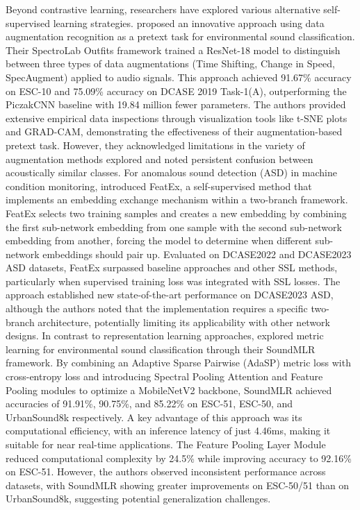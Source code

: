 \documentclass[11pt]{article}
\begin{document}
Beyond contrastive learning, researchers have explored various alternative self-supervised learning strategies. \citep{TRIPATHI2021108183} proposed an innovative approach using data augmentation recognition as a pretext task for environmental sound classification. Their SpectroLab Outfits framework trained a ResNet-18 model to distinguish between three types of data augmentations (Time Shifting, Change in Speed, SpecAugment) applied to audio signals. This approach achieved 91.67\% accuracy on ESC-10 and 75.09\% accuracy on DCASE 2019 Task-1(A), outperforming the PiczakCNN baseline with 19.84 million fewer parameters. The authors provided extensive empirical data inspections through visualization tools like t-SNE plots and GRAD-CAM, demonstrating the effectiveness of their augmentation-based pretext task. However, they acknowledged limitations in the variety of augmentation methods explored and noted persistent confusion between acoustically similar classes.
For anomalous sound detection (ASD) in machine condition monitoring, \citep{wilkinghoff2023selfsupervisedlearninganomaloussound} introduced FeatEx, a self-supervised method that implements an embedding exchange mechanism within a two-branch framework. FeatEx selects two training samples and creates a new embedding by combining the first sub-network embedding from one sample with the second sub-network embedding from another, forcing the model to determine when different sub-network embeddings should pair up. Evaluated on DCASE2022 and DCASE2023 ASD datasets, FeatEx surpassed baseline approaches and other SSL methods, particularly when supervised training loss was integrated with SSL losses. The approach established new state-of-the-art performance on DCASE2023 ASD, although the authors noted that the implementation requires a specific two-branch architecture, potentially limiting its applicability with other network designs.
In contrast to representation learning approaches, \citep{CHEN2025110593} explored metric learning for environmental sound classification through their SoundMLR framework. By combining an Adaptive Sparse Pairwise (AdaSP) metric loss with cross-entropy loss and introducing Spectral Pooling Attention and Feature Pooling modules to optimize a MobileNetV2 backbone, SoundMLR achieved accuracies of 91.91\%, 90.75\%, and 85.22\% on ESC-51, ESC-50, and UrbanSound8k respectively. A key advantage of this approach was its computational efficiency, with an inference latency of just 4.46ms, making it suitable for near real-time applications. The Feature Pooling Layer Module reduced computational complexity by 24.5\% while improving accuracy to 92.16\% on ESC-51. However, the authors observed inconsistent performance across datasets, with SoundMLR showing greater improvements on ESC-50/51 than on UrbanSound8k, suggesting potential generalization challenges.
\end{document}
